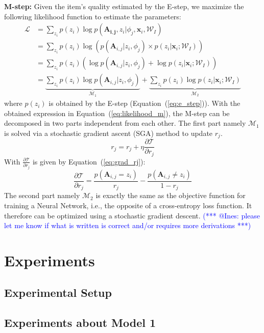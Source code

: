 \documentclass{article}
\makeatletter
\newcommand{\iar}[1]{\textcolor{blue}{(*** @Ines: #1 ***)}}
\makeatother
\begin{document}
\noindent\textbf{M-step:}
Given the item's quality estimated by the E-step, we maximize
the following likelihood function to estimate the parameters:
\begin{align}
   \mathcal{L}
    &=\sum_{z_i}p(z_i)\log p(\mathbf{A_{i,j}},z_i|\phi_j,\mathbf{x}_i,\mathcal{W}_I)\nonumber\\
    &=\sum_{z_i}p(z_i)\log (p(\mathbf{A}_{i,j}| z_i , \phi_j) \times p(z_i |\mathbf{x}_i;\mathcal{W}_I)) \nonumber\\
    &=\sum_{z_i}p(z_i) (\log p(\mathbf{A}_{i,j}| z_i , \phi_j)+\log p(z_i |\mathbf{x}_i;\mathcal{W}_I)) \nonumber\\
    &=\underbrace{\sum_{z_i}p(z_i) \log p(\mathbf{A}_{i,j}| z_i , \phi_j)}_{\mathcal{M}_1}
    +\underbrace{\sum_{z_i}p(z_i)\log p(z_i |\mathbf{x}_i;\mathcal{W}_I)}_{\mathcal{M}_2}
    \label{eq:likelihood_m}
\end{align}
where $p(z_i)$ is obtained by the E-step (Equation~(\ref{eq:e_step})). With the obtained expression in 
Equation~(\ref{eq:likelihood_m}), the M-step can be decomposed in two parts independent from each other.
The first part namely $\mathcal{M}_1$ is solved via a stochastic gradient
ascent (SGA) method to update $r_j$.
\begin{equation}
    r_j=r_j+\eta \frac{\partial \mathcal{T}}{\partial r_j}
    \label{eq:m_rj}
\end{equation}
With $\frac{\partial \mathcal{T}}{\partial r_j}$ is given by Equation~(\ref{eq:grad_rj}):
\begin{equation}
    \frac{\partial \mathcal{T}}{\partial r_j}=\frac{p(\mathbf{A}_{i,j}=z_i)}{r_j}-\frac{p(\mathbf{A}_{i,j}\neq z_i)}{1-r_j}
    \label{eq:grad_rj}
\end{equation}
The second part namely $\mathcal{M}_2$  is exactly the same as the objective function for 
training a Neural Network, i.e., the opposite of a cross-entropy loss function. 
It therefore can be optimized using a stochastic gradient descent.
\iar{please let me know if what is written is correct and/or requires more derivations}
\section{Experiments}

\subsection{Experimental Setup}

\subsection{Experiments about Model 1}
\end{document}
